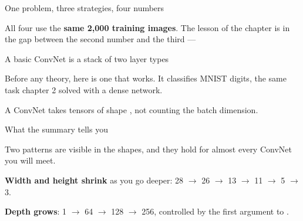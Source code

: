 \documentclass[aspectratio=169,11pt,t]{beamer}
\begin{document}
\begin{frame}[shrink=25]{One problem, three strategies, four numbers}
\begin{minipage}[t]{0.241\textwidth}
\end{minipage}%
\hfill
\begin{minipage}[t]{0.241\textwidth}
\end{minipage}%
\hfill
\begin{minipage}[t]{0.241\textwidth}
\end{minipage}%
\hfill
\begin{minipage}[t]{0.241\textwidth}
\end{minipage}%
{\fontsize{9.4}{12.6}\selectfont\color{fg2}All four use the \textbf{same 2,000 training images}. The lesson of the chapter is in the gap between the second number and the third --- \par}\vskip 4pt
\end{frame}


\begin{frame}[shrink=25]{A basic ConvNet is a stack of two layer types}
{\fontsize{9.4}{12.6}\selectfont\color{fg2}Before any theory, here is one that works. It classifies MNIST digits, the same task chapter 2 solved with a dense network.\par}\vskip 4pt
{\fontsize{9.4}{12.6}\selectfont\color{fg2}A ConvNet takes tensors of shape , not counting the batch dimension.\par}\vskip 4pt
\end{frame}

\begin{frame}[shrink=25]{What the summary tells you}
{\fontsize{9.4}{12.6}\selectfont\color{fg2}Two patterns are visible in the shapes, and they hold for almost every ConvNet you will meet.\par}\vskip 4pt
\begin{ibullets}
\item \textbf{Width and height shrink} as you go deeper: 28 $\rightarrow$ 26 $\rightarrow$ 13 $\rightarrow$ 11 $\rightarrow$ 5 $\rightarrow$ 3.
\item \textbf{Depth grows}: 1 $\rightarrow$ 64 $\rightarrow$ 128 $\rightarrow$ 256, controlled by the first argument to .
\end{ibullets}
\end{frame}
\end{document}
